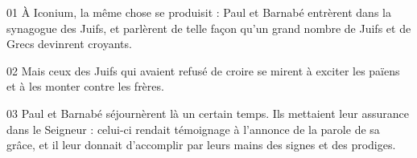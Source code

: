 01 À Iconium, la même chose se produisit : Paul et Barnabé entrèrent dans la synagogue des Juifs, et parlèrent de telle façon qu’un grand nombre de Juifs et de Grecs devinrent croyants.

02 Mais ceux des Juifs qui avaient refusé de croire se mirent à exciter les païens et à les monter contre les frères.

03 Paul et Barnabé séjournèrent là un certain temps. Ils mettaient leur assurance dans le Seigneur : celui-ci rendait témoignage à l’annonce de la parole de sa grâce, et il leur donnait d’accomplir par leurs mains des signes et des prodiges.